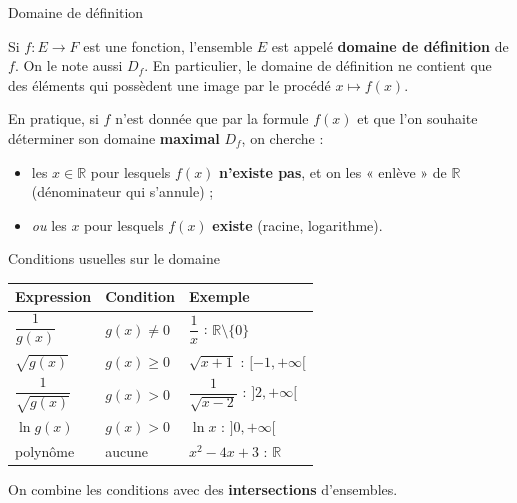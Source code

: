 \documentclass[aspectratio=169,11pt]{beamer}
\newcommand{\R}{\mathbb{R}}
\newcommand{\key}[1]{\textbf{\color{DarkBlue}#1}}
\newcommand{\important}[1]{\textbf{\color{DarkRed}#1}}
\newcommand{\fonc}[3]{#1\colon #2\to #3}
\begin{document}
\begin{frame}{Domaine de définition}
	\begin{definitionbox}
		Si $\fonc{f}{E}{F}$ est une fonction, l'ensemble $E$ est appelé
		\key{domaine de définition} de $f$. On le note aussi $D_f$.
		En particulier, le domaine de définition ne contient que des éléments
		qui possèdent une image par le procédé $x\longmapsto f(x)$.
	\end{definitionbox}
	\vspace{0.2cm}
	\begin{attentionbox}
		En pratique, si $f$ n'est donnée que par la formule $f(x)$ et que l'on souhaite
		déterminer son domaine \key{maximal} $D_f$, on cherche :
		\begin{itemize}
			\item les $x\in\R$ pour lesquels $f(x)$ \important{n'existe pas}, et on les
			« enlève » de $\R$ (dénominateur qui s'annule) ;
			\item \emph{ou} les $x$ pour lesquels $f(x)$ \important{existe}
			(racine, logarithme).
		\end{itemize}
	\end{attentionbox}
\end{frame}

\begin{frame}{Conditions usuelles sur le domaine}
	\begin{center}
		\renewcommand{\arraystretch}{1.35}
		\begin{tabular}{lll}
			\toprule
			\textbf{Expression} & \textbf{Condition} & \textbf{Exemple} \\
			\midrule
			$\dfrac{1}{g(x)}$ & $g(x)\neq 0$ & $\dfrac{1}{x}$ : $\R\setminus\{0\}$ \\
			$\sqrt{g(x)}$ & $g(x)\ge 0$ & $\sqrt{x+1}$ : $[-1,+\infty[$ \\
			$\dfrac{1}{\sqrt{g(x)}}$ & $g(x)>0$ & $\dfrac{1}{\sqrt{x-2}}$ : $]2,+\infty[$ \\
			$\ln g(x)$ & $g(x)>0$ & $\ln x$ : $]0,+\infty[$ \\
			polynôme & aucune & $x^2-4x+3$ : $\R$ \\
			\bottomrule
		\end{tabular}
	\end{center}
	\vspace{0.15cm}
	\begin{applicationbox}
		On combine les conditions avec des \key{intersections} d'ensembles.
	\end{applicationbox}
\end{frame}
\end{document}
